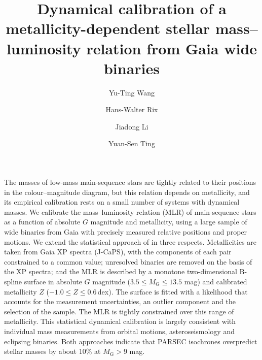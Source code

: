 \documentclass{aa}
\begin{document}
\title{Dynamical calibration of a metallicity-dependent stellar mass--luminosity relation from Gaia wide binaries}
\author{Yu-Ting Wang
        \and Hans-Walter Rix
        \and Jiadong Li
        \and Yuan-Sen Ting
        }



\abstract
  {The masses of low-mass main-sequence stars are tightly related to their positions in the colour--magnitude diagram, but this relation depends on metallicity, and its empirical calibration rests on a small number of systems with dynamical masses.}
  {We calibrate the mass--luminosity relation (MLR) of main-sequence stars as a function of absolute $G$ magnitude and metallicity, using a large sample of wide binaries from Gaia with precisely measured relative positions and proper motions.}
  {We extend the statistical approach of \citet{Hwang2024DynamicalMasses} in three respects. Metallicities are taken from Gaia XP spectra (J-CaPS), with the components of each pair constrained to a common value; unresolved binaries are removed on the basis of the XP spectra; and the MLR is described by a monotone two-dimensional B-spline surface in absolute $G$ magnitude ($3.5\le M_{\mathrm{G}}\le13.5$ mag) and calibrated metallicity $Z$ ($-1.0\le Z\le0.6$\,dex). The surface is fitted with a likelihood that accounts for the measurement uncertainties, an outlier component and the selection of the sample.}
  {The MLR is tightly constrained over this range of metallicity. This statistical dynamical calibration is largely consistent with individual mass measurements from orbital motions, asteroseismology and eclipsing binaries. Both approaches indicate that PARSEC isochrones overpredict stellar masses by about $10\%$ at $M_{\mathrm{G}}>9$ mag.%
  }
  {}



\maketitle
\end{document}
